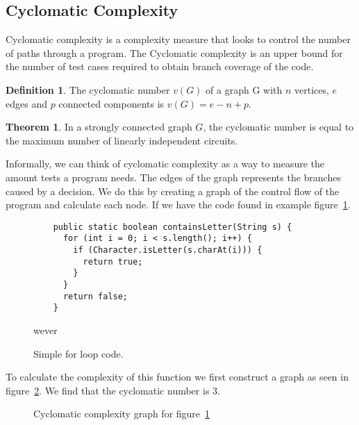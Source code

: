 \documentclass[12pt]{article}
\theoremstyle{definition}
\newtheorem*{definition}{Definition}
\theoremstyle{theorem}
\newtheorem*{theorem}{Theorem}
\begin{document}
\subsection{Cyclomatic Complexity}\label{cyclomaticcomplexity}

Cyclomatic complexity is a complexity measure that looks to control the number
of paths through a program. The Cyclomatic complexity is an upper bound for the number of
test cases required to obtain branch coverage of the code. 

\theoremstyle{definition}
\begin{definition}
The cyclomatic number $v(G)$ of a graph G with $n$ vertices, $e$ edges and $p$
connected components is $v(G) = e - n + p$.
\end{definition}

\begin{theorem}
In a strongly connected graph $G$, the cyclomatic number is equal to the
maximum number of linearly independent circuits.~\cite{McCabe}
\end{theorem}

Informally, we can think of cyclomatic complexity as a way to measure the amount
tests a program needs. The edges of the graph represents the branches caused by
a decision. We do this by creating a graph of the control flow of the program
and calculate each node. If we have the code found in example
figure~\ref{c1excode}.

\begin{figure}[H]
    \begin{lstlisting}
    public static boolean containsLetter(String s) {
      for (int i = 0; i < s.length(); i++) {
        if (Character.isLetter(s.charAt(i))) {
          return true;
        }
      }
      return false;
    }
    \end{lstlisting}
wever 
    \caption{Simple for loop code.}\label{c1excode}
\end{figure}

To calculate the complexity of this function we first construct a graph as seen
in figure~\ref{fig:c1exgraph}. We find that the cyclomatic number is 3.
\begin{figure}[H]
    \centering
    \caption{Cyclomatic complexity graph for figure~\ref{c1excode}}\label{fig:c1exgraph}
\end{figure}
\end{document}
